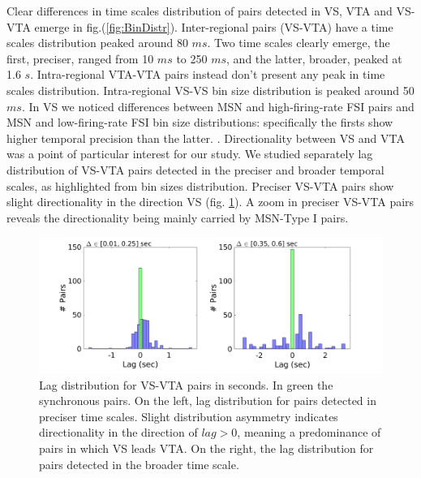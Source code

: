 Clear differences in time scales distribution of pairs detected in VS, VTA and VS-VTA emerge in fig.(\ref{fig:BinDistr}). Inter-regional pairs (VS-VTA) have a time scales distribution peaked around 80 $ms$. Two time scales clearly emerge, the first, preciser, ranged from 10 $ms$ to 250 $ms$, and the latter, broader, peaked at 1.6 $s$. Intra-regional VTA-VTA pairs instead don't present any peak in time scales distribution. Intra-regional VS-VS bin size distribution is peaked around 50 $ms$. In VS we noticed differences between MSN and high-firing-rate FSI pairs and MSN and low-firing-rate FSI bin size distributions: specifically the firsts show higher temporal precision than the latter. {\color{red}{Include Figure of MSN-FSI and caption of bin size distribution}}.
Directionality between VS and VTA was a point of particular interest for our study. We studied separately lag distribution of VS-VTA pairs detected in the preciser and broader temporal scales, as highlighted from bin sizes distribution. Preciser VS-VTA pairs show slight directionality in the direction VS (fig. \ref{fig:LagInSecAll}). A zoom in preciser VS-VTA pairs reveals the directionality being mainly carried by MSN-Type I pairs.
\begin{figure}[H]
\centering
\includegraphics[scale=0.3]{figures/LagGeneralInSec.png}
\caption{Lag distribution for VS-VTA pairs in seconds. In green the synchronous pairs. On the left, lag distribution for pairs detected in preciser time scales. Slight distribution asymmetry indicates directionality in the direction of $lag > 0$, meaning a predominance of pairs in which VS leads VTA. On the right, the lag distribution for pairs detected in the broader time scale.}
\label{fig:LagInSecAll}
\end{figure}

